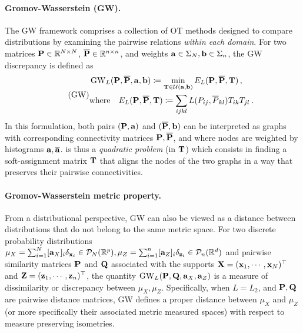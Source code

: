 \paragraph{Gromov-Wasserstein (GW).} The GW framework \citep{memoli2011gromov,sturm2012space} comprises a collection of OT methods designed to compare distributions by examining the pairwise relations \emph{within each domain}. For two matrices ${\mathbf{P}} \in \mathbb{R}^{N \times N}$, $\overline{{\mathbf{P}}} \in \mathbb{R}^{n \times n}$, and weights ${\mathbf{a}} \in \Sigma_N, {\mathbf{b}} \in \Sigma_n$, the GW discrepancy is defined as
\begin{equation}
\label{eq:gw_pb} 
\tag{GW}
\begin{split}
	&\operatorname{GW}_L ({\mathbf{P}}, \overline{{\mathbf{P}}}, {\mathbf{a}}, {\mathbf{b}}) \coloneqq \min_{{\mathbf{T}} \in {\mathcal{U}}({\mathbf{a}}, {\mathbf{b}})} E_L({\mathbf{P}}, \overline{{\mathbf{P}}}, {\mathbf{T}})\,, \\
	&\text{where} \quad E_L({\mathbf{P}}, \overline{{\mathbf{P}}}, {\mathbf{T}}) \coloneqq \sum_{ijkl}  L(P_{ij}, \overline{P}_{kl}) T_{ik} T_{jl} \:.
\end{split}
\end{equation}
In this formulation, both pairs $({\mathbf{P}}, {\mathbf{a}})$ and $(\overline{{\mathbf{P}}}, {\mathbf{b}})$ can be interpreted as graphs with corresponding connectivity matrices ${\mathbf{P}}, \overline {{\mathbf{P}}}$, and where nodes are weighted by histograms ${\mathbf{a}}, \overline {{\mathbf{a}}}$.  is thus a \emph{quadratic problem} (in ${\mathbf{T}}$) which consists in finding a soft-assignment matrix ${\mathbf{T}}$ that aligns the nodes of the two graphs in a way that preserves their pairwise connectivities. 

\paragraph{Gromov-Wasserstein metric property.}
From a distributional perspective, GW can also be viewed as a distance between distributions that do not belong to the same metric space. For two discrete probability distributions $\mu_X = \sum_{i=1}^N [{\mathbf{a}}_X]_i \delta_{{\mathbf{x}}_i} \in {\mathcal{P}}_N(\mathbb{R}^{p}), \mu_Z =\sum_{i=1}^n [{\mathbf{a}}_Z]_i \delta_{{\mathbf{z}}_i} \in {\mathcal{P}}_n(\mathbb{R}^d)$ and pairwise similarity matrices ${\mathbf{P}}$ and ${\mathbf{Q}}$ associated with the supports ${\mathbf{X}} = ({\mathbf{x}}_1, \cdots, {\mathbf{x}}_N)^\top$ and ${\mathbf{Z}} = ({\mathbf{z}}_1, \cdots, {\mathbf{z}}_n)^\top$, the quantity $\operatorname{GW}_L ({\mathbf{P}}, {\mathbf{Q}}, {\mathbf{a}}_X, {\mathbf{a}}_Z)$ is a measure of dissimilarity or discrepancy between $\mu_X, \mu_Z$. Specifically, when $L=L_2$, and ${\mathbf{P}}, {\mathbf{Q}}$ are pairwise distance matrices, GW defines a proper distance between $\mu_X$ and $\mu_Z$ (or more specifically their associated metric measured spaces) with respect to measure preserving isometries.

